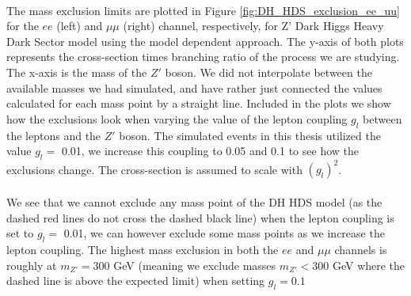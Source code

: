 \documentclass[12pt, a4paper]{book}
\begin{document}
\\The mass exclusion limits are plotted in Figure \ref{fig:DH_HDS_exclusion_ee_uu} for the $ee$ (left) and $\mu\mu$ (right) channel, respectively, for Z' Dark Higgs Heavy Dark Sector model using the model dependent approach. The y-axis of both plots represents the cross-section times branching ratio of the process we are studying. 
The x-axis is the mass of the $Z'$ boson. We did not interpolate between the available masses we had simulated, and have rather just connected the values calculated for each mass point by a straight line. 
Included in the plots we show how the exclusions look when varying the value of the lepton coupling $g_l$ between the leptons and the $Z'$ boson. The simulated events in this thesis utilized the value $g_l=$ 0.01, 
we increase this coupling to 0.05 and 0.1 to see how the exclusions change. The cross-section is assumed to scale with $(g_l)^2$.\\
\\We see that we cannot exclude any mass point of the DH HDS model (as the dashed red lines do not cross the dashed black line) when the lepton coupling is set to $g_l=$ 0.01, we can however exclude some mass points as we increase the lepton coupling. 
The highest mass exclusion in both the $ee$ and $\mu\mu$ channels is roughly at $m_{Z'}=300$ GeV (meaning we exclude masses $m_{Z'}<300$ GeV where the dashed line is above the expected limit) when setting $g_{l}=0.1$
\clearpage
\end{document}
